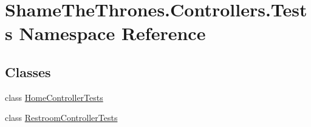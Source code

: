 \hypertarget{namespace_shame_the_thrones_1_1_controllers_1_1_tests}{}\section{Shame\+The\+Thrones.\+Controllers.\+Tests Namespace Reference}
\label{namespace_shame_the_thrones_1_1_controllers_1_1_tests}
\subsection*{Classes}
\begin{DoxyCompactItemize}
\item 
class \hyperlink{class_shame_the_thrones_1_1_controllers_1_1_tests_1_1_home_controller_tests}{Home\+Controller\+Tests}
\item 
class \hyperlink{class_shame_the_thrones_1_1_controllers_1_1_tests_1_1_restroom_controller_tests}{Restroom\+Controller\+Tests}
\end{DoxyCompactItemize}
